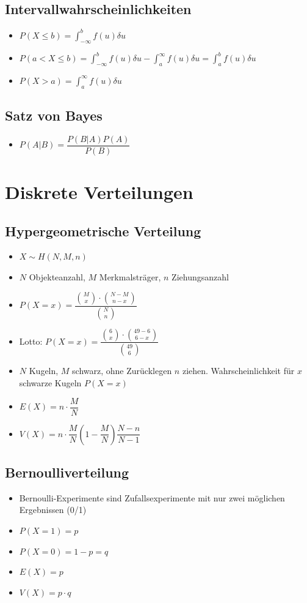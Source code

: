 \documentclass[8pt,a4paper]{scrartcl}
\begin{document}
\begin{multicols*}{3}
			\subsection{Intervallwahrscheinlichkeiten}		
				\begin{itemize}\itemsep0pt				
					\item $P(X \leq b) = \int_{-\infty}^b f(u)\delta u$
					\item $P(a < X \leq b) = \int_{-\infty}^b f(u)\delta u - \int_a^\infty f(u)\delta u =  \int_a^b f(u)\delta u $
					\item $P(X > a) = \int_a^\infty f(u)\delta u$
				\end{itemize}	
				
			\subsection{Satz von Bayes}		
				\begin{itemize}\itemsep0pt				
					\item $P(A|B) = \dfrac{P(B|A)P(A)}{P(B)}$
				\end{itemize}	
			
		\section{Diskrete Verteilungen}
			\subsection{Hypergeometrische Verteilung}
				\begin{itemize}\itemsep0pt			
					\item $X \sim H(N,M,n)$
					\item $N$ Objekteanzahl, $M$ Merkmalsträger, $n$ Ziehungsanzahl
					\item $P(X=x)=\dfrac{{M\choose x} \cdot {N-M\choose n-x}}{{N\choose n} }$
					\item Lotto: $P(X=x)=\dfrac{{6\choose x} \cdot {49-6\choose 6-x}}{{49\choose 6} }$
					\item $N$ Kugeln, $M$ schwarz, ohne Zurücklegen $n$ ziehen. Wahrscheinlichkeit für $x$ schwarze Kugeln $P(X=x)$
					\item $E(X) = n \cdot \dfrac{M}{N}$
					\item $V(X) = n \cdot \dfrac{M}{N} (1-\dfrac{M}{N})\dfrac{N-n}{N-1}$
				\end{itemize}	
			
			\subsection{Bernoulliverteilung}
				\begin{itemize}\itemsep0pt				
					\item Bernoulli-Experimente sind Zufallsexperimente mit nur zwei möglichen Ergebnissen (0/1)
					\item $P(X=1)=p$
					\item $P(X=0)=1-p=q$
					\item $E(X)=p$
					\item $V(X)=p\cdot q$
				\end{itemize}	
			

\end{multicols*}
\end{document}
